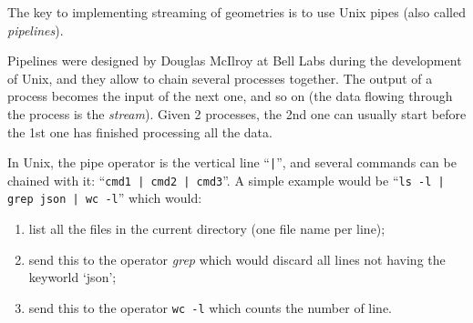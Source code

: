 \begin{kaobox-practice}[frametitle=\faCog\ Streaming is realised with Unix pipes]
  The key to implementing streaming of geometries is to use Unix pipes (also called \emph{pipelines}).

  Pipelines were designed by Douglas McIlroy at Bell Labs during the development of Unix, and they allow to chain several processes together. The output of a process becomes the input of the next one, and so on (the data flowing through the process is the \emph{stream}). Given 2 processes, the 2nd one can usually start before the 1st one has finished processing all the data.

  In Unix, the pipe operator is the vertical line ``\texttt{|}'', and several commands can be chained with it: ``\texttt{cmd1 | cmd2 | cmd3}''. A simple example would be ``\texttt{ls -l | grep json | wc -l}'' which would:
  \begin{enumerate}
    \item list all the files in the current directory (one file name per line); 
    \item send this to the operator \emph{grep} which would discard all lines not having the keyworld `json'; 
    \item send this to the operator \texttt{wc -l} which counts the number of line.
   \end{enumerate} 
\end{kaobox-practice}


